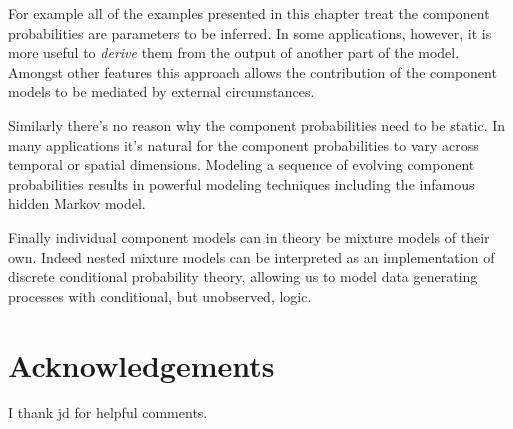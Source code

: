 \documentclass[
  letterpaper,
  DIV=11,
  numbers=noendperiod]{scrartcl}
\begin{document}
For example all of the examples presented in this chapter treat the
component probabilities are parameters to be inferred. In some
applications, however, it is more useful to \emph{derive} them from the
output of another part of the model. Amongst other features this
approach allows the contribution of the component models to be mediated
by external circumstances.

Similarly there's no reason why the component probabilities need to be
static. In many applications it's natural for the component
probabilities to vary across temporal or spatial dimensions. Modeling a
sequence of evolving component probabilities results in powerful
modeling techniques including the infamous hidden Markov model.

Finally individual component models can in theory be mixture models of
their own. Indeed nested mixture models can be interpreted as an
implementation of discrete conditional probability theory, allowing us
to model data generating processes with conditional, but unobserved,
logic.

\section*{Acknowledgements}\label{acknowledgements}

I thank jd for helpful comments.
\end{document}

